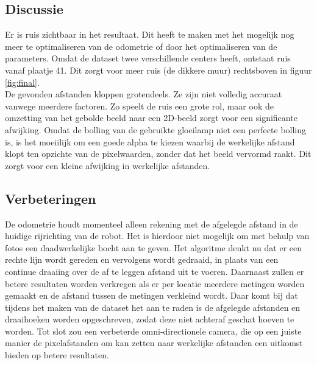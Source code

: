 \documentclass[a4paper]{article}
\begin{document}
\subsection{Discussie}
Er is ruis zichtbaar in het resultaat. Dit heeft te maken met het mogelijk nog meer te optimaliseren van de odometrie of door het optimaliseren van de parameters.
Omdat de dataset twee verschillende centers heeft, ontstaat ruis vanaf plaatje 41. Dit zorgt voor meer ruis (de dikkere muur) rechtsboven in figuur \ref{fig:final}.\\
De gevonden afstanden kloppen grotendeels. Ze zijn niet volledig accuraat vanwege meerdere factoren. Zo speelt de ruis een grote rol, maar ook de omzetting van het gebolde beeld naar een 2D-beeld zorgt voor een significante afwijking. Omdat de bolling van de gebruikte gloeilamp niet een perfecte bolling is, is het moeiilijk om een goede alpha te kiezen waarbij de werkelijke afstand klopt ten opzichte van de pixelwaarden, zonder dat het beeld vervormd raakt. Dit zorgt voor een kleine afwijking in werkelijke afstanden.
\subsection{Verbeteringen}
De odometrie houdt momenteel alleen rekening met de afgelegde afstand in de huidige rijrichting van de robot. Het is hierdoor niet mogelijk om met behulp van fotos een daadwerkelijke bocht aan te geven. Het algoritme denkt nu dat er een rechte lijn wordt gereden en vervolgens wordt gedraaid, in plaats van een continue draaiing over de af te leggen afstand uit te voeren. Daarnaast zullen er betere resultaten worden verkregen als er per locatie meerdere metingen worden gemaakt en de afstand tussen de metingen verkleind wordt. Daar komt bij dat tijdens het maken van de dataset het aan te raden is de afgelegde afstanden en draaihoeken worden opgeschreven, zodat deze niet achteraf geschat hoeven te worden. Tot slot zou een verbeterde omni-directionele camera, die op een juiste manier de pixelafstanden om kan zetten naar werkelijke afstanden een uitkomst bieden op betere resultaten.

\newpage
\end{document}
